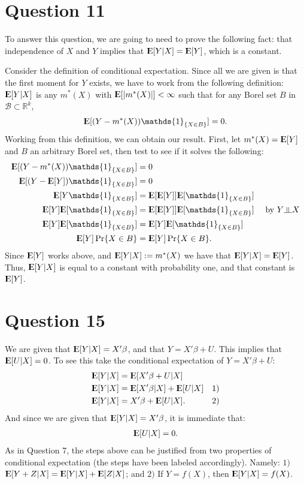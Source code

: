 \documentclass[12pt]{paper}
\newcommand{\Expect}{{\rm I\kern-.3em E}}
\newcommand{\indep}{\rotatebox[origin=c]{90}{$\models$}}
\begin{document}
\section{Question 11}
To answer this question, we are going to need to prove the following fact: that independence of $X$ and $Y$ implies that $\Expect[Y|X]=\Expect[Y]$, which is a constant.

Consider the definition of conditional expectation. Since all we are given is that the first moment for $Y$ exists, we have to work from the following definition: $\Expect[Y|X]$ is any $m^*(X)$ with $\Expect[|m^*(X)|]<\infty$ such that for any Borel set $B$ in $\mathcal{B} \subset \mathbb{R}^k$,
\begin{align*}
\Expect[(Y-m^*(X))\mathds{1}_{\{X\in B\}}]=0.
\end{align*}
Working from this definition, we can obtain our result. First, let $m^*(X)=\Expect[Y]$ and $B$ an arbitrary Borel set, then test to see if it solves the following:
\begin{align*}
\Expect[(Y-m^*(X))\mathds{1}_{\{X\in B\}}]&=0\\
\Expect[(Y-\Expect[Y])\mathds{1}_{\{X\in B\}}]&=0\\
\Expect[Y\mathds{1}_{\{X\in B\}}]&=\Expect[\Expect[Y]]\Expect[\mathds{1}_{\{X\in B\}}]\\
\Expect[Y]\Expect[\mathds{1}_{\{X\in B\}}]&=\Expect[\Expect[Y]]\Expect[\mathds{1}_{\{X\in B\}}]&\text{ by } Y \indep X\\
\Expect[Y]\Expect[\mathds{1}_{\{X\in B\}}]&=\Expect[Y]\Expect[\mathds{1}_{\{X\in B\}}]\\
\Expect[Y]\Pr\{X\in B\}&=\Expect[Y]\Pr\{X\in B\}.
\end{align*}
Since $\Expect[Y]$ works above, and $\Expect[Y|X]:=m^*(X)$ we have that $\Expect[Y|X]=\Expect[Y]$. Thus, $\Expect[Y|X]$ is equal to a constant with probability one, and that constant is $\Expect[Y]$.





\section{Question 15}
We are given that $\Expect[Y|X]=X' \beta$, and that $Y=X'\beta+U$. This implies that $\Expect[U|X]=0$. To see this take the conditional expectation of $Y=X'\beta+U$:
\begin{align*}
\Expect[Y|X]&=\Expect[X'\beta+U|X]\\
\Expect[Y|X]&=\Expect[X'\beta|X]+\Expect[U|X] &1)\\
\Expect[Y|X]&=X'\beta+\Expect[U|X]. &2)
\end{align*}
And since we are given that $\Expect[Y|X]=X' \beta$, it is immediate that:
\begin{align*}
\Expect[U|X]=0.
\end{align*}
As in Question 7, the steps above can be justified from two properties of conditional expectation (the steps have been labeled accordingly). Namely: $1)$ $\Expect[Y+Z|X]=\Expect[Y|X]+\Expect[Z|X]$; and $2)$ If $Y=f(X)$, then $\Expect[Y|X]=f(X)$.
\end{document}
